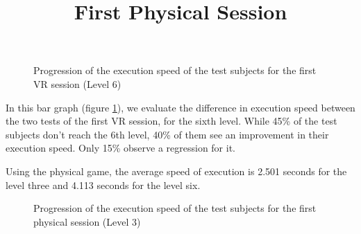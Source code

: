 \documentclass[12pt, openany, twocolumn]{article}
\begin{document}
                \begin{figure}[H]
                    \centering
                    \setlength{\fboxsep}{0pt}
                    \caption{Progression of the execution speed of the test subjects for the first VR session (Level 6)}
                    \label{figure20}
                \end{figure}
        
            In this bar graph (figure \ref{figure20}), we evaluate the difference in execution speed between the two tests of the first VR session, for the sixth level. 
            While 45\% of the test subjects don't reach the 6th level, 40\% of them see an improvement in their execution speed. Only 15\% observe a regression for it.
            \\

            \noindent \title{\textbf{First Physical Session}}  \vspace{0.25cm}
            
            Using the physical game, the average speed of execution is 2.501 seconds for the level three and 4.113 seconds for the level six.

                \begin{figure}[H]
                    \centering
                    \setlength{\fboxsep}{0pt}
                    \caption{Progression of the execution speed of the test subjects for the first physical session (Level 3)}
                    \label{figure21}
                \end{figure}
\end{document}
